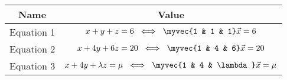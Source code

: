 \begin{tabular}{|c|c|}
\hline
Name & Value \\
\hline
Equation 1 & $x+y+z=6 \;\;\Longleftrightarrow\;\; \myvec{1 & 1 & 1}\vec{x}=6$ \\
\hline
Equation 2 & $x+4y+6z=20 \;\;\Longleftrightarrow\;\; \myvec{1 & 4 & 6}\vec{x}=20$ \\
\hline
Equation 3 & $x+4y+\lambda z=\mu \;\;\Longleftrightarrow\;\; \myvec{1 & 4 & \lambda}\vec{x}=\mu$ \\
\hline
\end{tabular}
